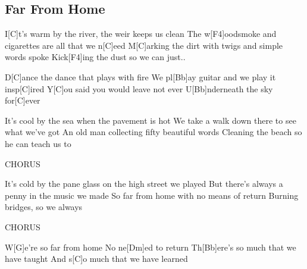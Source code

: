 \subsection*{Far From Home   }
\begin{guitar}
I[C]t's warm by the river, the weir keeps us clean
The w[F4]oodsmoke and cigarettes are all that we n[C]eed
M[C]arking the dirt with twigs and simple words spoke
Kick[F4]ing the dust so we can just..



D[C]ance the dance that plays with fire
We pl[Bb]ay guitar and we play it insp[C]ired
Y[C]ou said you would leave not ever
U[Bb]nderneath the sky for[C]ever


			    
It's cool by the sea when the pavement is hot
We take a walk down there to see what we've got
An old man collecting fifty beautiful words
Cleaning the beach so he can teach us to
			        


CHORUS



It's cold by the pane glass on the high street we played
But there's always a penny in the music we made
So far from home with no means of return
Burning bridges, so we always



CHORUS



W[G]e're so far from home
No ne[Dm]ed to return
Th[Bb]ere's so much that we have taught 
And s[C]o much that we have learned 

\end{guitar}
